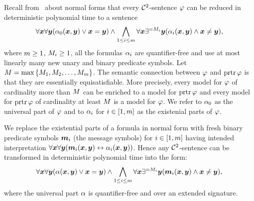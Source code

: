 Recall from~ about normal forms that every $\mathcal{C}^{2}$-sentence
$\varphi$ can be reduced in deterministic polynomial time to a sentence
\[
  \forall\bm{x}\forall\bm{y}(\alpha_{0}(\bm{x},\bm{y}) \lor \bm{x}=\bm{y}) \land
  \bigwedge_{1 \leq i \leq m} \forall\bm{x}\exists^{=M_{i}}\bm{y}
  (\alpha_{i}(\bm{x},\bm{y}) \land \bm{x}\neq\bm{y}),
\]
where $m\geq1$, $M_{i}\geq1$, all the formulas $\alpha_{i}$ are
quantifier-free and use at most linearly many new unary and binary predicate symbols.
Let $M = \max\left\{M_{1},M_{2},\dots,M_{m}\right\}$.
The semantic connection between $\varphi$ and $\operatorname{prtr}\varphi$ is that they are
essentially equisatisfiable.
More precisely, every model for $\varphi$ of cardinality more than $M$ can be
enriched to a model for $\operatorname{prtr}\varphi$ and every model for $\operatorname{prtr}\varphi$ of
cardinality at least $M$ is a model for $\varphi$.
We refer to $\alpha_{0}$ as the universal part of $\varphi$ and to $\alpha_{i}$ for
$i\in[1,m]$ as the existenial parts of $\varphi$.

We replace the existential parts of a formula in normal form with fresh binary
predicate symbols $\bm{m}_{i}$ (the message symbols) for $i\in[1,m]$
having intended interpretation
$\forall\bm{x}\forall\bm{y}(\bm{m}_{i}(\bm{x},\bm{y})\leftrightarrow\alpha_{i}(\bm{x},\bm{y}))$.
Hence any $\mathcal{C}^{2}$-sentence can be transformed in deterministic polynomial time
into the form:
\begin{equation}\label{eq:counting-base}
\forall\xx\forall\yy(\falp(\xx,\yy)\lor\xx=\yy) \land
\bigwedge_{1\leq\ii\leq\nm} \forall\xx\existseq{\nMM\ii}\yy
(\smm\ii(\xx,\yy)\land\xx\neq\yy),
\end{equation}
where the universal part $\alpha$ is quantifier-free and over an extended
signature.

